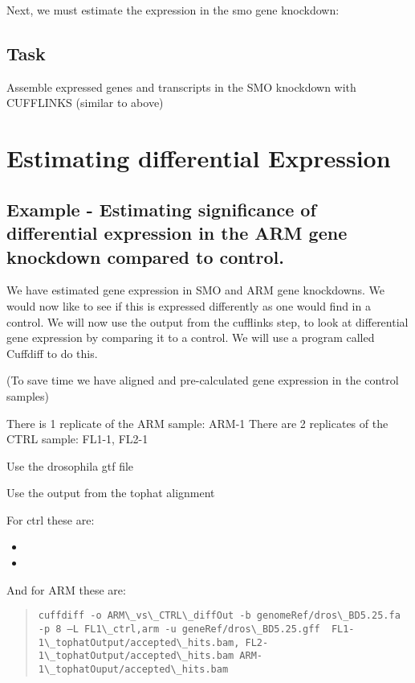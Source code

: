 \documentclass[letterpaper,10pt,english]{sphinxmanual}
\begin{document}
Next, we must estimate the expression in the smo gene knockdown:


\section{Task}
\label{STEP4_CUFFLINKS_DE:task}
Assemble expressed genes and transcripts in the SMO knockdown with CUFFLINKS (similar to above)


\chapter{Estimating differential Expression}
\label{STEP4_CUFFLINKS_DE:estimating-differential-expression}

\section{Example - Estimating significance of differential expression in the ARM gene knockdown compared to control.}
\label{STEP4_CUFFLINKS_DE:example-estimating-significance-of-differential-expression-in-the-arm-gene-knockdown-compared-to-control}
We have estimated gene expression in SMO and ARM gene knockdowns. We would now like to see if this is expressed differently as one would find in a control. We will now use the output from the cufflinks step, to look at differential gene expression by comparing it to a control. We will use a program called Cuffdiff to do this.

(To save time we have aligned and pre-calculated gene expression in the control samples)

There is 1 replicate of the ARM sample: ARM-1
There are 2 replicates of the CTRL sample: FL1-1, FL2-1

Use the drosophila gtf file 

Use the  output from the tophat alignment

For ctrl these are:
\begin{itemize}
\item {} 

\item {} 

\end{itemize}

And for ARM these are:
\begin{quote}

\begin{Verbatim}[commandchars=\\\{\}]
cuffdiff -o ARM\_vs\_CTRL\_diffOut -b genomeRef/dros\_BD5.25.fa -p 8 –L FL1\_ctrl,arm -u geneRef/dros\_BD5.25.gff  FL1-1\_tophatOutput/accepted\_hits.bam, FL2-1\_tophatOutput/accepted\_hits.bam ARM-1\_tophatOuput/accepted\_hits.bam
\end{Verbatim}
\end{quote}
\end{document}
